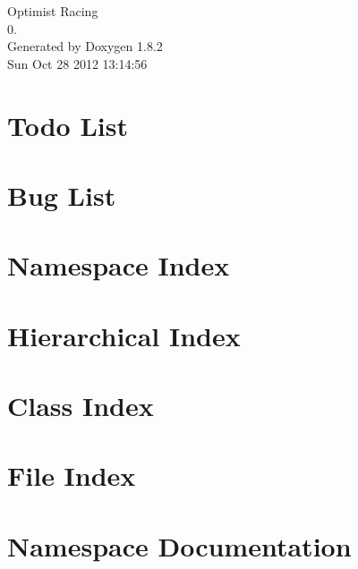 \documentclass{book}
\begin{document}
\hypersetup{pageanchor=false,citecolor=blue}
\begin{titlepage}
\vspace*{7cm}
\begin{center}
{\Large Optimist Racing \\[1ex]\large 0. }\\
\vspace*{1cm}
{\large Generated by Doxygen 1.8.2}\\
\vspace*{0.5cm}
{\small Sun Oct 28 2012 13:14:56}\\
\end{center}
\end{titlepage}
\clearemptydoublepage
{}
\tableofcontents
\clearemptydoublepage
{}
\hypersetup{pageanchor=true,citecolor=blue}
\chapter{Todo List}
\label{todo}
\hypertarget{todo}{}

\chapter{Bug List}
\label{bug}
\hypertarget{bug}{}

\chapter{Namespace Index}

\chapter{Hierarchical Index}

\chapter{Class Index}

\chapter{File Index}

\chapter{Namespace Documentation}


\end{document}
